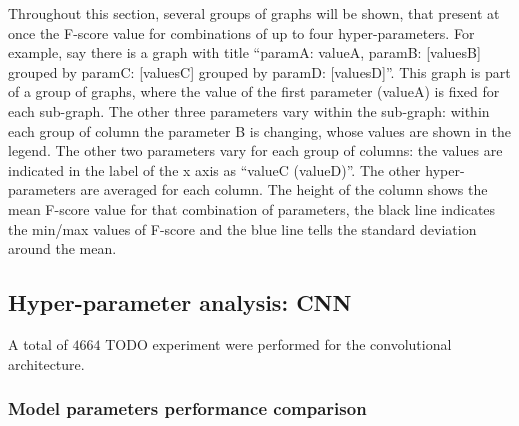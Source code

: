 Throughout this section, several groups of graphs will be shown, that present
at once the F-score value for combinations of up to four hyper-parameters.
For example, say there is a graph 
with title 
``paramA: valueA, paramB: [valuesB]
grouped by paramC: [valuesC]
grouped by paramD: [valuesD]''.
This graph is part of a group of graphs, where the value of the first parameter
(valueA) is fixed for each sub-graph.
The other three parameters vary within the sub-graph:
within each group of column the parameter B is changing,
whose values are shown in the legend.
The other two parameters vary for each group of columns:
the values are indicated in the label of the x axis as ``valueC (valueD)''.
The other hyper-parameters are averaged for each column.
The height of the column shows the mean F-score value for that
combination of parameters,
the black line indicates the min/max values of F-score and the
blue line tells the standard deviation around the mean.

\subsection{Hyper-parameter analysis: CNN}


A total of $4664$ TODO experiment were performed for the convolutional architecture.

\subsubsection{Model parameters performance comparison}

